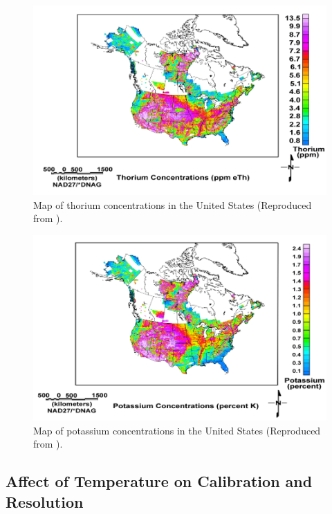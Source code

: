 \begin{figure}[H]
\centering
\includegraphics[width=0.9\linewidth]{images/USGS_th_conc}
\caption{Map of thorium concentrations in the United States (Reproduced from \cite{USGS}).}
\label{fig:USGS_th_conc}
\end{figure}

\begin{figure}[H]
\centering
\includegraphics[width=0.9\linewidth]{images/USGS_k_conc}
\caption{Map of potassium concentrations in the United States (Reproduced from \cite{USGS}).}
\label{fig:USGS_k_conc}
\end{figure}



\subsection{Affect of Temperature on Calibration and Resolution}

